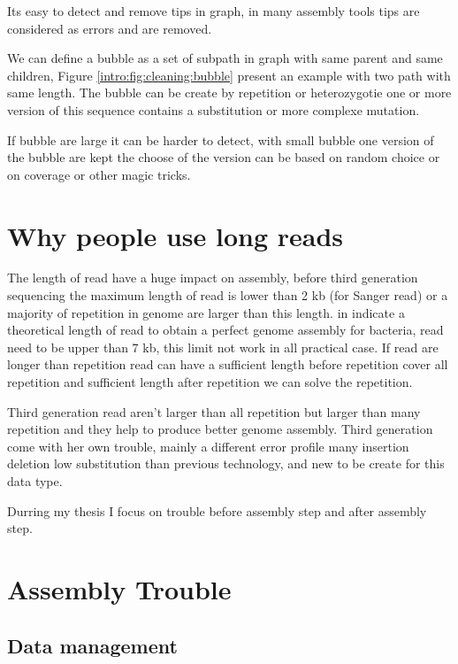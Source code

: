 \documentclass[./main.tex]{subfiles}
\begin{document}
Its easy to detect and remove tips in graph, in many assembly tools tips are considered as errors and are removed.

We can define a bubble as a set of subpath in graph with same parent and same children, Figure \ref{intro:fig:cleaning:bubble} present an example with two path with same length. The bubble can be create by repetition or heterozygotie one or more version of this sequence contains a substitution or more complexe mutation.

If bubble are large it can be harder to detect, with small bubble one version of the bubble are kept the choose of the version can be based on random choice or on coverage or other magic tricks.

\section{Why people use long reads}

The length of read have a huge impact on assembly, before third generation sequencing the maximum length of read is lower than 2 kb (for Sanger read) or a majority of repetition in genome are larger than this length. \citeauthor{one_chromosome_one_contig} in \cite{one_chromosome_one_contig} indicate a theoretical length of read to obtain a perfect genome assembly for bacteria, read need to be upper than 7 kb, this limit not work in all practical case. If read are longer than repetition read can have a sufficient length before repetition cover all repetition and sufficient length after repetition we can solve the repetition.

Third generation read aren't larger than all repetition but larger than many repetition and they help to produce better genome assembly.
Third generation come with her own trouble, mainly a different error profile many insertion deletion low substitution than previous technology, and new to be create for this data type.

Durring my thesis I focus on trouble before assembly step and after assembly step.

\section{Assembly Trouble}

\subsection{Data management}
\end{document}
